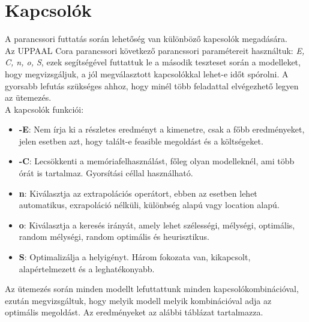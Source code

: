 \documentclass {report}
\begin{document}
   \section{Kapcsolók}
   A parancssori futtatás során lehetőség van különböző kapcsolók megadására.\\ 
   Az UPPAAL Cora parancssori következő parancssori paramétereit használtuk: \emph{E, C, n, o, S}, ezek segítségével futtattuk le a második teszteset során a modelleket, hogy megvizsgáljuk, a jól megválasztott kapcsolókkal lehet-e időt spórolni. A gyorsabb lefutás szükséges ahhoz, hogy minél több feladattal elvégezhető legyen az ütemezés.\\
   A kapcsolók funkciói:\\
   \begin{itemize}
   \item \textbf{-E}: Nem írja ki a részletes eredményt a kimenetre, csak a főbb eredményeket, jelen esetben azt, hogy talált-e feasible megoldást és a költségeket.
   \item \textbf{-C}: Lecsökkenti a memóriafelhasználást, főleg olyan modelleknél, ami több órát is tartalmaz. Gyorsítási céllal használható.
   \item \textbf{n}: Kiválasztja az extrapolációs operátort, ebben az esetben lehet automatikus, exrapoláció nélküli, különbség alapú vagy location alapú.
   \item \textbf{o}: Kiválasztja a keresés irányát, amely lehet szélességi, mélységi, optimális, random mélységi, random optimális és heurisztikus.
   \item \textbf{S}: Optimalizálja a helyigényt. Három fokozata van, kikapcsolt, alapértelmezett és a leghatékonyabb.
   \end{itemize}
   Az ütemezés során minden modellt lefuttattunk minden kapcsolókombinációval, ezután megvizsgáltuk, hogy melyik modell melyik kombinációval adja az optimális megoldást. Az eredményeket az alábbi táblázat tartalmazza.\\
\end{document}
